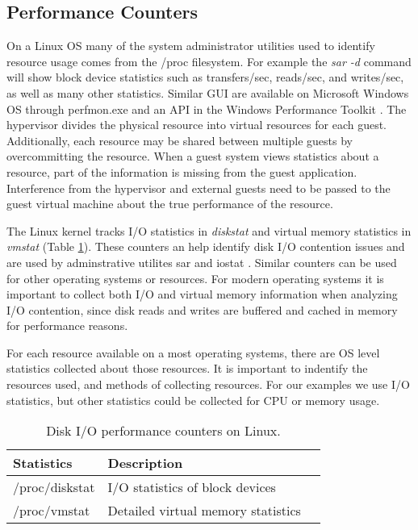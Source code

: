 \subsection{Performance Counters}
On a Linux OS many of the system administrator utilities used to identify resource usage comes from the /proc filesystem. 
For example the \emph{sar -d} command will show block device statistics such as transfers/sec, reads/sec, and writes/sec, as well as many other statistics.  
Similar GUI are available on Microsoft Windows OS through perfmon.exe and an API in the Windows Performance Toolkit \cite{winperf}. 
The hypervisor divides the physical resource into virtual resources for each guest.  
Additionally, each resource may be shared between multiple guests by overcommitting the resource.  
When a guest system views statistics about a resource, part of the information is missing from the guest application.  
Interference from the hypervisor and external guests need to be passed to the guest virtual machine about the true performance of the resource. 

\indent The Linux kernel tracks I/O statistics in \emph{diskstat} and virtual memory statistics in \emph{vmstat} (Table \ref{tab:iocounters}).  
These counters an help identify disk I/O contention issues and are used by adminstrative utilites sar and iostat \cite{iostats}.  
Similar counters can be used for other operating systems or resources. 
For modern operating systems it is important to collect both I/O and virtual memory information when analyzing I/O contention, since disk reads and writes are buffered and cached in memory for performance reasons. 

\indent For each resource available on a most operating systems, there are OS level statistics collected about those resources.  It is important to indentify the resources used, and methods of collecting resources.  
For our examples we use I/O statistics, but other statistics could be collected for CPU or memory usage.

\begin{table}
\begin{tabular}{ l l p{5cm} }
  Statistics & Description \\
  \hline
  /proc/diskstat & I/O statistics of block devices \\
  /proc/vmstat & Detailed virtual memory statistics\\
  \hline
\end{tabular}
\caption{Disk I/O performance counters on Linux.}
\label{tab:iocounters}
\end{table}


